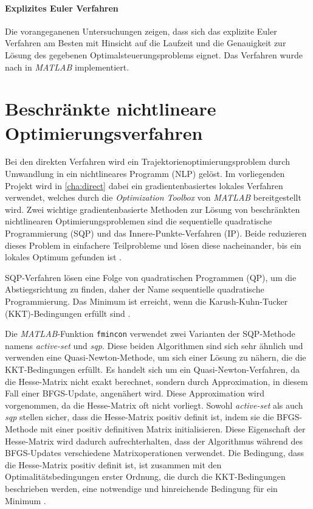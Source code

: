 \paragraph{Explizites Euler Verfahren}
Die vorangeganenen Untersuchungen zeigen, dass sich das explizite Euler Verfahren am Besten mit Hinsicht auf die Laufzeit und die Genauigkeit zur Lösung des gegebenen Optimalsteuerungsproblems eignet. Das Verfahren wurde nach \cite{Brokate2016} in \textit{MATLAB} implementiert.

\section{Beschränkte nichtlineare Optimierungsverfahren}
Bei den direkten Verfahren wird ein Trajektorienoptimierungsproblem durch Umwandlung in ein nichtlineares Programm (NLP) gelöst. Im vorliegenden Projekt wird in \autoref{cha:direct} dabei ein gradientenbasiertes lokales Verfahren verwendet, welches durch die \textit{Optimization Toolbox} von \textit{MATLAB} bereitgestellt wird. Zwei wichtige gradientenbasierte Methoden zur Lösung von beschränkten nichtlinearen Optimierungsproblemen sind die sequentielle quadratische Programmierung (SQP) und das Innere-Punkte-Verfahren (IP). Beide reduzieren dieses Problem in einfachere Teilprobleme und lösen diese nacheinander, bis ein lokales Optimum gefunden ist \cite{Betts2010}.

SQP-Verfahren lösen eine Folge von quadratischen Programmen (QP), um die Abstiegsrichtung zu finden, daher der Name sequentielle quadratische Programmierung. Das Minimum ist erreicht, wenn die Karush-Kuhn-Tucker (KKT)-Bedingungen erfüllt sind \cite{Matlab2016}.

Die \textit{MATLAB}-Funktion \texttt{fmincon} verwendet zwei Varianten der SQP-Methode namens \textit{active-set} und \textit{sqp}. Diese beiden Algorithmen sind sich sehr ähnlich und verwenden eine Quasi-Newton-Methode, um sich einer Lösung zu nähern, die die KKT-Bedingungen erfüllt. Es handelt sich um ein Quasi-Newton-Verfahren, da die Hesse-Matrix nicht exakt berechnet, sondern durch Approximation, in diesem Fall einer BFGS-Update, angenähert wird. Diese Approximation wird vorgenommen, da die Hesse-Matrix oft nicht vorliegt. Sowohl \textit{active-set} als auch \textit{sqp} stellen sicher, dass die Hesse-Matrix positiv definit ist, indem sie die BFGS-Methode mit einer positiv definitiven Matrix initialisieren. Diese Eigenschaft der Hesse-Matrix wird dadurch aufrechterhalten, dass der Algorithmus während des BFGS-Updates verschiedene Matrixoperationen verwendet. Die Bedingung, dass die Hesse-Matrix positiv definit ist, ist zusammen mit den Optimalitätsbedingungen erster Ordnung, die durch die KKT-Bedingungen beschrieben werden, eine notwendige und hinreichende Bedingung für ein Minimum \cite{Matlab2016}. 

